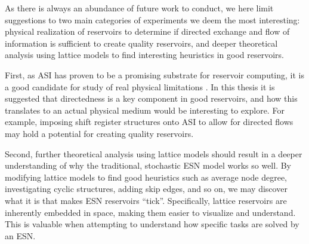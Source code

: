 As there is always an abundance of future work to conduct, we here limit
suggestions to two main categories of experiments we deem the most interesting:
physical realization of reservoirs to determine if directed exchange and flow of
information is sufficient to create quality reservoirs, and deeper theoretical
analysis using lattice models to find interesting heuristics in good reservoirs.

First, as ASI has proven to be a promising substrate for reservoir computing, it
is a good candidate for study of real physical limitations
\cite{jensen_reservoir_2020}. In this thesis it is suggested that directedness
is a key component in good reservoirs, and how this translates to an actual
physical medium would be interesting to explore. For example, imposing shift
register structures onto ASI to allow for directed flows may hold a potential
for creating quality reservoirs.

Second, further theoretical analysis using lattice models should result in a
deeper understanding of why the traditional, stochastic ESN model works so
well. By modifying lattice models to find good heuristics such as average node
degree, investigating cyclic structures, adding skip edges, and so on, we may
discover what it is that makes ESN reservoirs ``tick''. Specifically, lattice
reservoirs are inherently embedded in space, making them easier to visualize and
understand. This is valuable when attempting to understand how specific tasks
are solved by an ESN.

